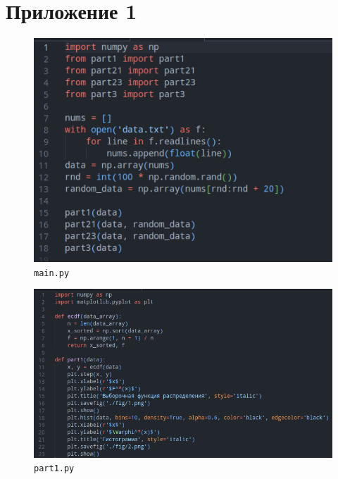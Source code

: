 \documentclass[a4paper,12pt]{article}
\begin{document}
    \section*{Приложение 1}
    \begin{figure}[H]
        \centering
        \includegraphics[width=0.65\linewidth]{polytech/stats/homework-2/subfiles/fig/main}
        \caption{\texttt{main.py}}
    \end{figure}
    \begin{figure}[H]
        \centering
        \includegraphics[width=0.7\linewidth]{polytech/stats/homework-2/subfiles/fig/part1}
        \caption{\texttt{part1.py}}
    \end{figure}
\end{document}
